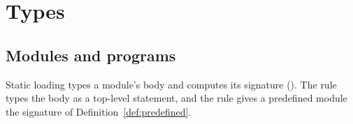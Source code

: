 \section{Types}
\label{sec:types-remaining}

\subsection{Modules and programs}
\label{sec:typing-modules}

Static loading types a module's body and computes its signature
(). The  rule types the
body as a top-level statement, and the  rule gives a predefined module the signature
of Definition~\ref{def:predefined}.



\FloatBarrier
